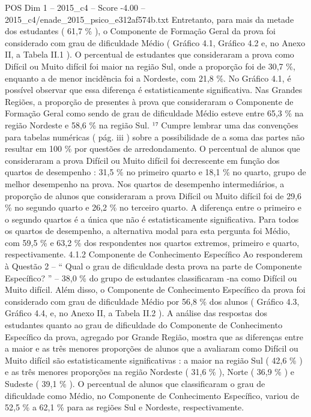 \begin{textsample}{POS Dim 1 – 2015\_c4 – Score -4.00 – 2015\_c4/enade\_2015\_psico\_e312af574b.txt}
Entretanto, para mais da metade dos estudantes ( 61,7 \% ), o Componente de Formação Geral da prova foi considerado com grau de dificuldade Médio ( Gráfico 4.1, Gráfico 4.2 e, no Anexo II, a Tabela II.1 ).
O percentual de estudantes que consideraram a prova como Difícil ou Muito difícil foi maior na região Sul, onde a proporção foi de 30,7 \%, enquanto a de menor incidência foi a Nordeste, com 21,8 \%.
No Gráfico 4.1, é possível observar que essa diferença é estatisticamente significativa.
Nas Grandes Regiões, a proporção de presentes à prova que consideraram o Componente de Formação Geral como sendo de grau de dificuldade Médio esteve entre 65,3 \% na região Nordeste e 58,6 \% na região Sul. ¹⁷ Cumpre lembrar uma das convenções para tabelas numéricas ( pág. iii ) sobre a possibilidade de a soma das partes não resultar em 100 \% por questões de arredondamento.
O percentual de alunos que consideraram a prova Difícil ou Muito difícil foi decrescente em função dos quartos de desempenho : 31,5 \% no primeiro quarto e 18,1 \% no quarto, grupo de melhor desempenho na prova.
Nos quartos de desempenho intermediários, a proporção de alunos que consideraram a prova Difícil ou Muito difícil foi de 29,6 \% no segundo quarto e 26,2 \% no terceiro quarto.
A diferença entre o primeiro e o segundo quartos é a única que não é estatisticamente significativa.
Para todos os quartos de desempenho, a alternativa modal para esta pergunta foi Médio, com 59,5 \% e 63,2 \% dos respondentes nos quartos extremos, primeiro e quarto, respectivamente. 4.1.2 Componente de Conhecimento Específico Ao responderem à Questão 2 – “ Qual o grau de dificuldade desta prova na parte de Componente Específico? ” – 38,0 \% do grupo de estudantes classificaram -na como Difícil ou Muito difícil.
Além disso, o Componente de Conhecimento Específico da prova foi considerado com grau de dificuldade Médio por 56,8 \% dos alunos ( Gráfico 4.3, Gráfico 4.4, e, no Anexo II, a Tabela II.2 ).
A análise das respostas dos estudantes quanto ao grau de dificuldade do Componente de Conhecimento Específico da prova, agregado por Grande Região, mostra que as diferenças entre a maior e as três menores proporções de alunos que a avaliaram como Difícil ou Muito difícil são estatisticamente significativas : a maior na região Sul ( 42,6 \% ) e as três menores proporções na região Nordeste ( 31,6 \% ), Norte ( 36,9 \% ) e Sudeste ( 39,1 \% ).
O percentual de alunos que classificaram o grau de dificuldade como Médio, no Componente de Conhecimento Específico, variou de 52,5 \% a 62,1 \% para as regiões Sul e Nordeste, respectivamente.

\end{textsample}
